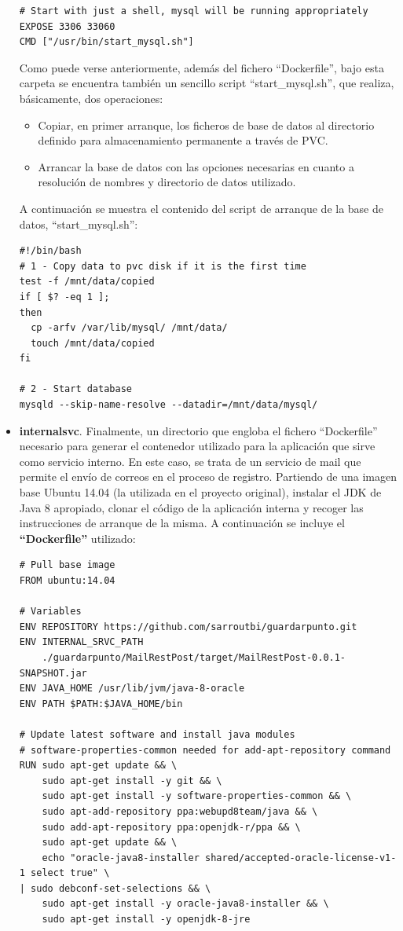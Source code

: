 \documentclass[12pt,spanish]{article}
\begin{document}
\begin{itemize}
\begin{verbatim}
# Start with just a shell, mysql will be running appropriately
EXPOSE 3306 33060
CMD ["/usr/bin/start_mysql.sh"]
\end{verbatim}
Como puede verse anteriormente, además del fichero ``Dockerfile'', bajo esta carpeta se encuentra también un sencillo script ``start\_mysql.sh'', que realiza, básicamente, dos operaciones:
\begin{itemize}
\item{Copiar, en primer arranque, los ficheros de base de datos al directorio definido para almacenamiento permanente a través de PVC}.
\item{Arrancar la base de datos con las opciones necesarias en cuanto a resolución de nombres y directorio de datos utilizado}.
\end{itemize}
A continuación se muestra el contenido del script de arranque de la base de datos, ``start\_mysql.sh'':
\begin{verbatim}
#!/bin/bash
# 1 - Copy data to pvc disk if it is the first time
test -f /mnt/data/copied
if [ $? -eq 1 ];
then
  cp -arfv /var/lib/mysql/ /mnt/data/
  touch /mnt/data/copied
fi

# 2 - Start database
mysqld --skip-name-resolve --datadir=/mnt/data/mysql/
\end{verbatim}

\item{\textbf{internalsvc}}. Finalmente, un directorio que engloba el fichero ``Dockerfile'' necesario para generar el contenedor utilizado para la aplicación que sirve como servicio interno. En este caso, se trata de un servicio de mail que permite el envío de correos en el proceso de registro. Partiendo de una imagen base Ubuntu 14.04 (la utilizada en el proyecto original), instalar el JDK de Java 8 apropiado, clonar el código de la aplicación interna y recoger las instrucciones de arranque de la misma. A continuación se incluye el \textbf{``Dockerfile''} utilizado:
\begin{verbatim}
# Pull base image
FROM ubuntu:14.04

# Variables
ENV REPOSITORY https://github.com/sarroutbi/guardarpunto.git
ENV INTERNAL_SRVC_PATH
    ./guardarpunto/MailRestPost/target/MailRestPost-0.0.1-SNAPSHOT.jar
ENV JAVA_HOME /usr/lib/jvm/java-8-oracle
ENV PATH $PATH:$JAVA_HOME/bin

# Update latest software and install java modules
# software-properties-common needed for add-apt-repository command
RUN sudo apt-get update && \
    sudo apt-get install -y git && \
    sudo apt-get install -y software-properties-common && \
    sudo apt-add-repository ppa:webupd8team/java && \
    sudo add-apt-repository ppa:openjdk-r/ppa && \
    sudo apt-get update && \
    echo "oracle-java8-installer shared/accepted-oracle-license-v1-1 select true" \
| sudo debconf-set-selections && \
    sudo apt-get install -y oracle-java8-installer && \
    sudo apt-get install -y openjdk-8-jre


\end{verbatim}
\end{itemize}
\end{document}
